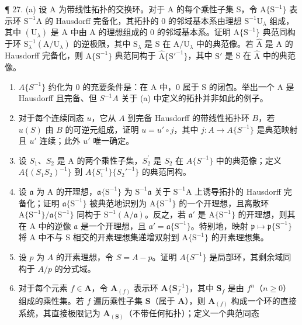 ¶ 27. (a) 设 A 为带线性拓扑的交换环。对于 A 的每个乘性子集 S，令 \(\mathrm{A}\{\mathrm{S}^{-1}\}\) 表示环 \(\mathrm{S}^{-1}\mathrm{A}\) 的 Hausdorff 完备化，其拓扑的 0 的邻域基本系由理想 \(\mathrm{S}^{-1}\mathrm{U}_{\lambda}\) 组成，其中 \((\mathrm{U}_{\lambda})\) 是 A 中由 A 的理想组成的 0 的邻域基本系。证明 \(\mathrm{A}\{\mathrm{S}^{-1}\}\) 典范同构于环 \(\mathrm{S}_{\lambda}^{-1}(\mathrm{A}/\mathrm{U}_{\lambda})\) 的逆极限，其中 \(\mathrm{S}_{\lambda}\) 是 S 在 \(\mathrm{A}/\mathrm{U}_{\lambda}\) 中的典范像。若 \(\hat{\mathrm{A}}\) 是 A 的 Hausdorff 完备化，则 \(\mathrm{A}\{\mathrm{S}^{-1}\}\) 典范同构于 \(\hat{\mathrm{A}}\{\mathrm{S}'^{-1}\}\)，其中 \(\mathrm{S}'\) 是 S 在 \(\hat{\mathrm{A}}\) 中的典范像。

\begin{enumerate}
\def\labelenumi{(\alph{enumi})}
\setcounter{enumi}{1}
\item
  \(A\{S^{-1}\}\) 约化为 0 的充要条件是：在 A 中，0 属于 S 的闭包。举出一个 A 是 Hausdorff 且完备、但 \(S^{-1}A\) 关于 (a) 中定义的拓扑并非如此的例子。
\item
  对于每个连续同态 \(u\)，它从 \(A\) 到完备 Hausdorff 的带线性拓扑环 \(B\)，若 \(u(S)\) 由 \(B\) 的可逆元组成，证明 \(u = u' \circ j\)，其中 \(j: A \to A\{S^{-1}\}\) 是典范映射且 \(u'\) 连续；此外 \(u'\) 唯一确定。
\item
  设 \(S_{1}\)、\(S_{2}\) 是 A 的两个乘性子集，\(S_{2}^{\prime}\) 是 \(S_{2}\) 在 \(A\{S^{-1}\}\) 中的典范像；定义 \(A\{(S_{1}S_{2})^{-1}\}\) 到 \(A\{S_{1}^{-1}\}\{S_{2}'^{-1}\}\) 的典范同构。
\item
  设 \(\mathfrak{a}\) 为 A 的开理想，\(\mathfrak{a}\{\mathrm{S}^{-1}\}\) 为 \(\mathrm{S}^{-1}\mathfrak{a}\) 关于 \(\mathrm{S}^{-1}\mathrm{A}\) 上诱导拓扑的 Hausdorff 完备化；证明 \(\mathfrak{a}\{\mathrm{S}^{-1}\}\) 被典范地识别为 \(\mathrm{A}\{\mathrm{S}^{-1}\}\) 的一个开理想，且离散环 \(\mathrm{A}\{\mathrm{S}^{-1}\} / \mathfrak{a}\{\mathrm{S}^{-1}\}\) 同构于 \(\mathrm{S}^{-1}(\mathrm{A} / \mathfrak{a})\)。反之，若 \(\mathfrak{a}'\) 是 \(\mathrm{A}\{\mathrm{S}^{-1}\}\) 的开理想，则其在 A 中的逆像 \(\mathfrak{a}\) 是一个开理想，且 \(\mathfrak{a}' = \mathfrak{a}\{\mathrm{S}^{-1}\}\)。特别地，映射 \(\mathfrak{p} \mapsto \mathfrak{p}\{\mathrm{S}^{-1}\}\) 将 A 中不与 S 相交的开素理想集递增双射到 \(\mathrm{A}\{\mathrm{S}^{-1}\}\) 的开素理想集。
\item
  设 \(p\) 为 \(A\) 的开素理想，令 \(S = A - p\)。证明 \(A\{S^{-1}\}\) 是局部环，其剩余域同构于 \(A / p\) 的分式域。
\item
  对于每个元素 \(f \in \mathbf{A}\)，令 \(\mathbf{A}_{(f)}\) 表示环 \(\mathbf{A}\{\mathbf{S}_f^{-1}\}\)，其中 \(\mathbf{S}_f\) 是由 \(f^n\)（\(n \geqslant 0\)）组成的乘性集。若 \(f\) 遍历乘性子集 \(\mathbf{S}\)（属于 \(\mathbf{A}\)），则 \(\mathbf{A}_{(f)}\) 构成一个环的直接系统，其直接极限记为 \(\mathbf{A}_{(\mathbf{S})}\)（不带任何拓扑）；定义一个典范同态
\end{enumerate}

